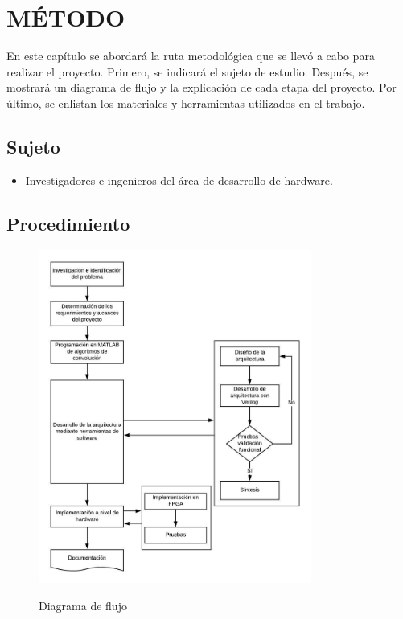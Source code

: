\renewcommand\thechapter{\Roman{chapter}}
\chapter{MÉTODO} \label{ch:metodo} \thispagestyle{fancy}
\renewcommand\thechapter{\arabic{chapter}}
En este capítulo se abordará la ruta metodológica que se llevó a cabo para realizar el proyecto. Primero, se indicará el sujeto de estudio. Después, se mostrará un diagrama de flujo y la explicación de cada etapa del proyecto. Por último, se enlistan los materiales y herramientas utilizados en el trabajo.


\section{Sujeto}
\begin{itemize}
\item Investigadores e ingenieros del área de desarrollo de hardware. 
\end{itemize}

\section{Procedimiento}

\begin{figure}[!h]
\centering
\includegraphics[width=0.8\textwidth, height=0.9\textheight]{./figs/procedimiento}\\
\caption{Diagrama de flujo}
\label{diagramaflujo}
\end{figure}

